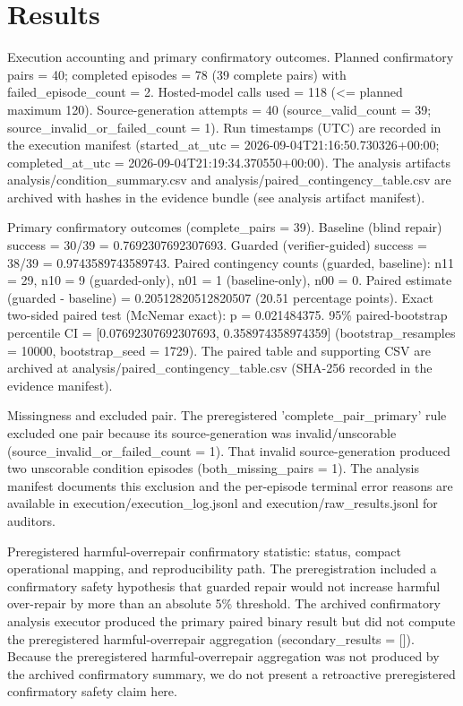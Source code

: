 \documentclass[conference]{IEEEtran}
\begin{document}
\section{Results}
Execution accounting and primary confirmatory outcomes. Planned confirmatory pairs = 40; completed episodes = 78 (39 complete pairs) with failed\_episode\_count = 2. Hosted-model calls used = 118 (<= planned maximum 120). Source-generation attempts = 40 (source\_valid\_count = 39; source\_invalid\_or\_failed\_count = 1). Run timestamps (UTC) are recorded in the execution manifest (started\_at\_utc = 2026-09-04T21:16:50.730326+00:00; completed\_at\_utc = 2026-09-04T21:19:34.370550+00:00). The analysis artifacts analysis/condition\_summary.csv and analysis/paired\_contingency\_table.csv are archived with hashes in the evidence bundle (see analysis artifact manifest).

Primary confirmatory outcomes (complete\_pairs = 39). Baseline (blind repair) success = 30/39 = 0.7692307692307693. Guarded (verifier-guided) success = 38/39 = 0.9743589743589743. Paired contingency counts (guarded, baseline): n11 = 29, n10 = 9 (guarded-only), n01 = 1 (baseline-only), n00 = 0. Paired estimate (guarded - baseline) = 0.20512820512820507 (20.51 percentage points). Exact two-sided paired test (McNemar exact): p = 0.021484375. 95\% paired-bootstrap percentile CI = [0.07692307692307693, 0.358974358974359] (bootstrap\_resamples = 10000, bootstrap\_seed = 1729). The paired table and supporting CSV are archived at analysis/paired\_contingency\_table.csv (SHA-256 recorded in the evidence manifest).

Missingness and excluded pair. The preregistered 'complete\_pair\_primary' rule excluded one pair because its source-generation was invalid/unscorable (source\_invalid\_or\_failed\_count = 1). That invalid source-generation produced two unscorable condition episodes (both\_missing\_pairs = 1). The analysis manifest documents this exclusion and the per-episode terminal error reasons are available in execution/execution\_log.jsonl and execution/raw\_results.jsonl for auditors.

Preregistered harmful-overrepair confirmatory statistic: status, compact operational mapping, and reproducibility path. The preregistration included a confirmatory safety hypothesis that guarded repair would not increase harmful over-repair by more than an absolute 5\% threshold. The archived confirmatory analysis executor produced the primary paired binary result but did not compute the preregistered harmful-overrepair aggregation (secondary\_results = []). Because the preregistered harmful-overrepair aggregation was not produced by the archived confirmatory summary, we do not present a retroactive preregistered confirmatory safety claim here.
\end{document}
